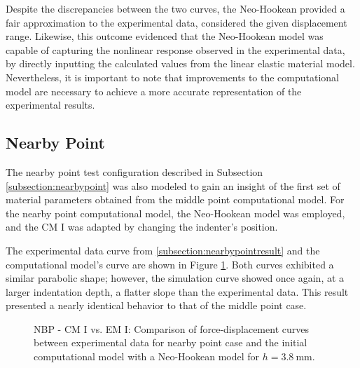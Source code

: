 Despite the discrepancies between the two curves, the Neo-Hookean provided a fair approximation to the experimental data, considered the 
given displacement range. Likewise, this outcome evidenced that the Neo-Hookean model was capable of capturing the nonlinear 
response observed in the experimental data, by directly inputting the calculated values from the linear elastic material model.
Nevertheless, it is important to note that improvements to the computational model are necessary to achieve a more
accurate representation of the experimental results.

\subsection{Nearby Point}
The nearby point test configuration described in Subsection \ref{subsection:nearbypoint} was also modeled to gain an insight 
of the first set of material parameters obtained from the middle point computational model.
For the nearby point computational model, the Neo-Hookean model was employed, and the CM I was adapted by changing the 
indenter's position.

The experimental data curve from \ref{subsection:nearbypointresult} and the computational model's curve are shown in Figure 
\ref{fig:nbpointIvsCPINBNH}. Both curves exhibited a similar parabolic shape; however, the simulation curve showed once again,
at a larger indentation depth, a flatter slope than the experimental data. This result presented a 
nearly identical behavior to that of the middle point case.\\
\label{subsection:nbpcpI}
\begin{figure}%
    \centering
   \quad
   \caption[Nearby point: CM I vs. Experimental data - Neo-Hookean]{NBP - CM I vs. EM I: Comparison of force-displacement curves between experimental data for nearby point case and the initial computational model with a Neo-Hookean model for $h = \SI{3.8}{\milli \meter}$.}%
   \label{fig:nbpointIvsCPINBNH}%
\end{figure}

